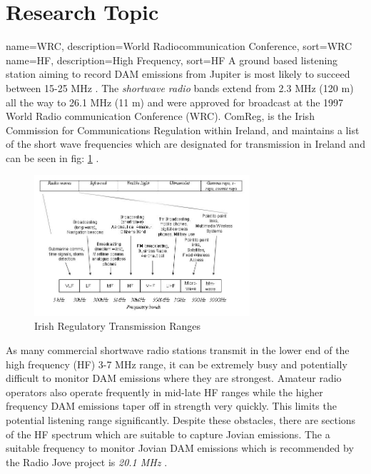 \documentclass[runningheads,a4paper]{llncs}
\begin{document}
%
%
\newpage
\section*{Research Topic}
%
%
{
  name={WRC},
  description={World Radiocommunication Conference},
  sort=WRC
}
{
  name={HF},
  description={High Frequency},
  sort=HF
}
%
A ground based listening station aiming to record \gls{DAM} emissions from Jupiter is most likely to succeed between 15-25 MHz \citep{wilkinson94}. The \textit{shortwave radio} bands extend from 2.3 MHz (120 m) all the way to 26.1 MHz (11 m) and were approved for broadcast at the 1997 World Radio communication Conference (\gls{WRC}). ComReg, is the Irish Commission for Communications Regulation within Ireland, and maintains a list of the short wave frequencies which are designated for transmission in Ireland and can be seen in fig: \ref{fig:irish_electromagnetic_transmission_ranges} \citep{comreg14}.

%
\begin{figure}[here]
\centering
\includegraphics[width=8cm]{images/06}
\caption{Irish Regulatory Transmission Ranges \citep{comreg14}}
\label{fig:irish_electromagnetic_transmission_ranges}
\end{figure}
%

As many commercial shortwave radio stations transmit in the lower end of the high frequency (\gls{HF}) 3-7 MHz range, it can be extremely busy and potentially difficult to monitor \gls{DAM} emissions where they are strongest. Amateur radio operators also operate frequently in mid-late \gls{HF} ranges while the higher frequency \gls{DAM} emissions taper off in strength very quickly. This limits the potential listening range significantly. Despite these obstacles, there are sections of the \gls{HF} spectrum which are suitable to capture Jovian emissions. The a suitable frequency to monitor Jovian \gls{DAM} emissions which is recommended by the Radio Jove project is \textit{20.1 MHz} \citep{nasa12}. 
\end{document}
